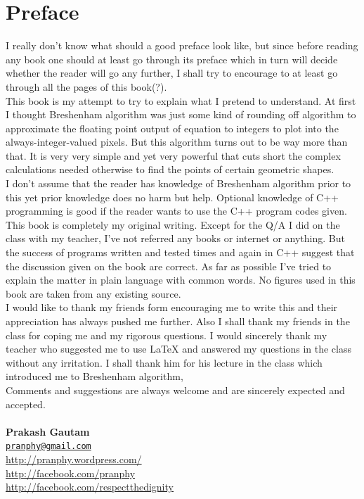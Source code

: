 \documentclass[a4paper,12pt,oneside]{book}
\begin{document}


\section*{Preface}

I really don't know what should a good preface look like, but since before reading any book one should at least go through its preface which in turn will decide whether the reader will go any further, I shall try to encourage to at least go through all the pages of this book(?).\\

This book is my attempt to try to explain what I pretend to understand. At first I thought Breshenham algorithm was just some kind of rounding off algorithm to approximate the floating point output of equation to integers to plot into the always-integer-valued pixels. But this algorithm turns out to be way more than that. It is very very simple and yet very powerful that cuts short the complex calculations needed otherwise to find the points of certain geometric shapes.\\

I don't assume that the reader has knowledge of Breshenham algorithm prior to this yet prior knowledge does no harm but help. Optional knowledge of C++ programming is good if the reader wants to use the C++ program codes given.
\\ This book is completely my original writing. Except for the Q/A I did on the class with my teacher, I've not referred any books or internet or anything. But the success of programs written and tested times and again in C++ suggest that the discussion given on the book are correct. As far as possible I've tried to explain the matter in plain language with common words. No figures  used in this book are taken from any existing source.\\

I would like to thank my friends form encouraging me to write this and their appreciation has always pushed me further. Also I shall thank my friends in the class for coping me and my rigorous questions. I would sincerely thank my teacher who suggested me to use {\LaTeX} and answered my questions in the class without any irritation. I shall thank him for his lecture in the class which introduced me to Breshenham algorithm,\\

Comments and suggestions are always welcome and are sincerely expected and accepted.
\\
\\
\textbf{Prakash Gautam}\\
\href{mailto:pranphy@gmail.com}{\nolinkurl{pranphy@gmail.com}}\\
\url{http://pranphy.wordpress.com/}\\[.5cm]
\url{http://facebook.com/pranphy}\\
\url{http://facebook.com/respectthedignity}\\
\end{document}
